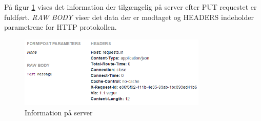\vspace{1cm}

På figur \ref{fig:put_req} vises det information der tilgængelig på server efter PUT requestet er fuldført. \textit{RAW BODY} viser det data der er modtaget og HEADERS indeholder parametrene for HTTP protokollen.

\begin{figure}[H]
\centering
\includegraphics[width=0.8\textwidth]{Billeder/Test/put_request.png}
\caption{Information på server}
\label{fig:put_req}
\end{figure}
